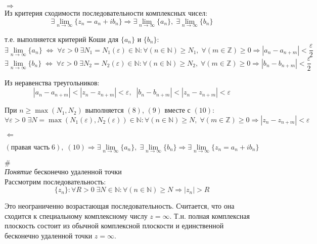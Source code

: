 \documentclass{article}
\begin{document}
	\textit{$\Rightarrow$}\\

		Из критерия сходимости последовательности комплексных чисел:
		\begin{equation}
			\exists\lim_{n\rightarrow \infty} \{z_n=a_n+ib_n\} \Rightarrow \exists\lim_{n\rightarrow \infty} \{a_n\},\;\exists\lim_{n\rightarrow \infty} \{b_n\} 
		\end{equation}

		т.е. выполняется критерий Коши для $\{a_n\}$ и $\{b_n\}$:
		\begin{equation}
			\exists\lim_{n\rightarrow \infty} \{a_n\}\; \Leftrightarrow\; \forall\varepsilon>0 \; \exists N_1=N_1(\varepsilon)\in\mathbb{N}:\forall (n\in\mathbb{N})\geq N_1,\;\forall (m\in\mathbb{Z})\geq 0 \Rightarrow |a_n-a_{n+m}|<\frac{\varepsilon}{2}			
		\end{equation}
		\begin{equation}
			\exists\lim_{n\rightarrow \infty} \{b_n\}\; \Leftrightarrow\; \forall\varepsilon>0 \; \exists N_2=N_2(\varepsilon)\in\mathbb{N}:\forall (n\in\mathbb{N})\geq N_2,\;\forall (m\in\mathbb{Z})\geq 0 \Rightarrow |b_n-b_{n+m}|<\frac{\varepsilon}{2}			
		\end{equation}

		Из неравенства треугольников:
		\begin{equation}
			|a_n-a_{n+m}|<|z_n-z_{n+m}|<\varepsilon,\;\;|b_n-b_{n+m}|<|z_n-z_{n+m}|<\varepsilon
		\end{equation}
		
		При $n\geq \max(N_1,N_2)$ выполняется $(8)$, $(9)$ вместе с $(10)$:
		\begin{equation}
			\forall\varepsilon>0 \; \exists N=\max(N_1(\varepsilon),N_2(\varepsilon))\in\mathbb{N}:\forall (n\in\mathbb{N})\geq N,\;\forall (m\in\mathbb{Z})\geq 0 \Rightarrow |z_n-z_{n+m}|<\varepsilon
		\end{equation}

	\textit{$\Leftarrow$}

		\begin{equation}
			(\text{правая часть}\; 6), \; (10) \Rightarrow \exists\lim_{n\rightarrow \infty} \{a_n\},\;\exists\lim_{n\rightarrow \infty} \{b_n\} \Rightarrow \exists\lim_{n\rightarrow \infty} \{z_n=a_n+ib_n\}
		\end{equation}

	$\#$\\

	\textit{Понятие} бесконечно удаленной точки\\

	Рассмотрим последовательность:
	\begin{equation}
		\{z_n\}: \forall R>0\; \exists N\in\mathbb{N}: \forall (n\in\mathbb{N})\geq N \Rightarrow |z_n|>R
	\end{equation}

	Это неограниченно возрастающая последовательность. Считается, что она сходится к специальному комплексному числу $z=\infty$. Т.н. полная комплексная плоскость состоит из обычной комплексной плоскости и единственной бесконечно удаленной точки $z=\infty$.

	


	
\end{document}
